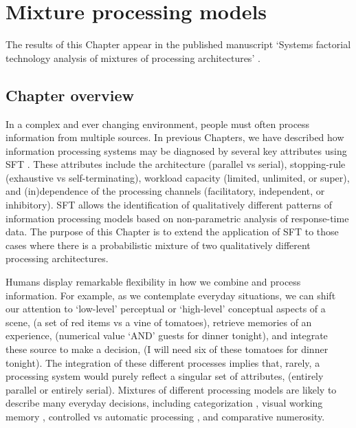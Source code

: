 \chapter{Mixture processing models} 

\label{Chapter 5}

\vspace{3cm}
\newpage



\noindent
The results of this Chapter appear in the published manuscript `Systems factorial technology analysis of mixtures of processing architectures' \cite{Little2018mixmodel}.

\section{Chapter overview}
In a complex and ever changing environment, people must often process information from multiple sources. In previous Chapters, we have described how information processing systems may be diagnosed by several key attributes using SFT \cite{Townsend_1995, Townsend_2004, Little2017}. These attributes include the architecture (parallel vs serial), stopping-rule (exhaustive vs self-terminating), workload capacity (limited, unlimited, or super), and (in)dependence of the processing channels (facilitatory, independent, or inhibitory). SFT allows the identification of qualitatively different patterns of information processing models based on non-parametric analysis of response-time data. The purpose of this Chapter is to extend the application of SFT to those cases where there is a probabilistic mixture of two qualitatively different processing architectures. 

Humans display remarkable flexibility in how we combine and process information. For example, as we contemplate everyday situations, we can shift our attention to `low-level' perceptual or `high-level' conceptual aspects of a scene, (\eg a set of red items vs a vine of tomatoes), retrieve memories of an experience, (\eg numerical value `AND' guests for dinner tonight), and integrate these source to make a decision, (\eg I will need six of these tomatoes for dinner tonight). The integration of these different processes implies that, rarely, a processing system would purely reflect a singular set of attributes, (\eg entirely parallel or entirely serial). Mixtures of different processing models are likely to describe many everyday decisions, including categorization \cite{Little2011, Moneer2016, Cheng2017, Griffiths2017}, visual working memory \cite{Donkin2013}, controlled vs automatic processing \cite{Shiffrin1977,schneider1977controlled}, and comparative numerosity.

